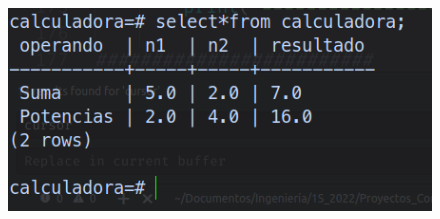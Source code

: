 \documentclass[12pt,letterpaper]{article}
\begin{document}
\begin{multicols}{2}
\begin{figure}[H]
\centering
\includegraphics[width = \columnwidth]{calc_6.png}
\end{figure}


\end{multicols}
\end{document}
